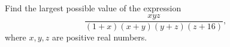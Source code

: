Find the largest possible value of the expression
$$\frac{xyz}{(1+x)(x+y)(y+z)(z+16)},$$
where $x,y,z$ are positive real numbers.
